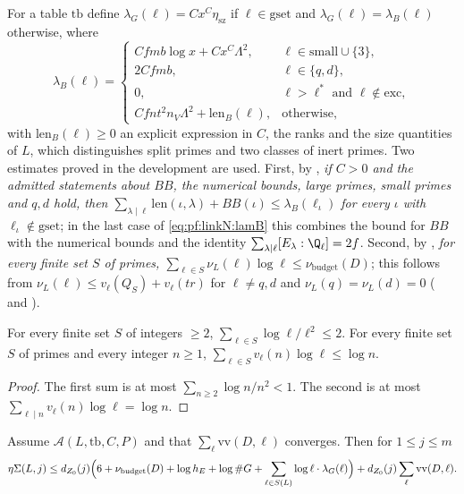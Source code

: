 For a table $\mathrm{tb}$ define $\lambda_G(\ell)=Cx^C\eta_{\mathrm{sz}}$ if $\ell\in\mathrm{gset}$ and $\lambda_G(\ell)=\lambda_B(\ell)$
otherwise, where
\begin{equation}\label{eq:pf:linkN:lamB}
\lambda_B(\ell)=\begin{cases}
Cfmb\log x+Cx^C\Lambda^2,&\ell\in\mathrm{small}\cup\{3\},\\
2Cfmb,&\ell\in\{q,d\},\\
0,&\ell>\ell^*\text{ and }\ell\notin\mathrm{exc},\\
Cfnt^2n_V\Lambda^2+\mathrm{len}_B(\ell),&\text{otherwise},
\end{cases}
\end{equation}
with $\mathrm{len}_B(\ell)\ge0$ an explicit expression in $C$, the ranks and the size quantities of $L$, which distinguishes
split primes and two classes of inert primes. Two estimates proved in the development are used. First, by
, \emph{if $C>0$ and the admitted statements about $BB$, the
numerical bounds, large primes, small primes and $q,d$ hold, then
$\sum_{\lambda\mid\ell}\mathrm{len}(\iota,\lambda)+BB(\iota)\le\lambda_B(\ell_\iota)$ for every $\iota$ with $\ell_\iota\notin\mathrm{gset}$}; in
the last case of \eqref{eq:pf:linkN:lamB} this combines the bound for $BB$ with the numerical bounds and the identity
$\sum_{\lambda\mid\ell}[E_\lambda:\Q_\ell]=2f$. Second, by , \emph{for every finite set
$S$ of primes, $\sum_{\ell\in S}\nu_L(\ell)\log\ell\le\nu_{\mathrm{budget}}(D)$}; this follows from $\nu_L(\ell)\le v_\ell(Q_S)+v_\ell(tr)$
for $\ell\ne q,d$ and $\nu_L(q)=\nu_L(d)=0$ ( and ).

\begin{lemma}\label{pf:linkN:smallsums}
For every finite set $S$ of integers $\ge2$, $\sum_{\ell\in S}\log\ell/\ell^2\le2$. For every finite set $S$ of primes and every
integer $n\ge1$, $\sum_{\ell\in S}v_\ell(n)\log\ell\le\log n$.
\end{lemma}

\begin{proof}
The first sum is at most $\sum_{n\ge2}\log n/n^2<1$. The second is at most $\sum_{\ell\mid n}v_\ell(n)\log\ell=\log n$.
\end{proof}

\begin{proposition}\label{pf:linkN:etaSumle}
Assume $\mathcal A(L,\mathrm{tb},C,P)$ and that $\sum_\ell\mathrm{vv}(D,\ell)$ converges. Then for $1\le j\le m$
\[
\eta\Sigma(L,j)\le d_{Z_0}(j)\Bigl(6+\nu_{\mathrm{budget}}(D)+\log h_E+\log\#G+\sum_{\ell\in S(L)}\log\ell\cdot\lambda_G(\ell)\Bigr)
+d_{Z_0}(j)\sum_\ell\mathrm{vv}(D,\ell).
\]
\end{proposition}

